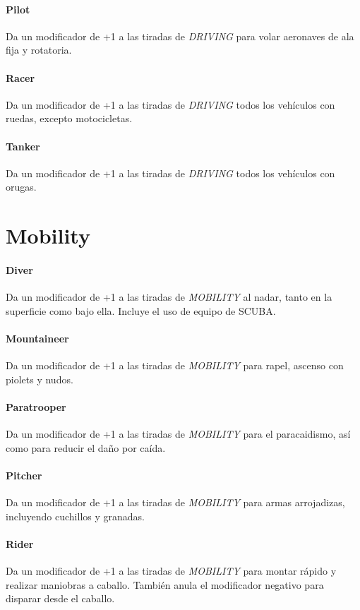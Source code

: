     \paragraph{Pilot}
    Da un modificador de +1 a las tiradas de \emph{DRIVING} para volar aeronaves de ala fija y rotatoria.

    \paragraph{Racer}
    Da un modificador de +1 a las tiradas de \emph{DRIVING} todos los vehículos con ruedas, excepto motocicletas.

    \paragraph{Tanker}
    Da un modificador de +1 a las tiradas de \emph{DRIVING} todos los vehículos con orugas.

\section{Mobility}

    \paragraph{Diver}
    Da un modificador de +1 a las tiradas de \emph{MOBILITY} al nadar, tanto en la superficie como bajo ella. Incluye el uso de equipo de SCUBA.

    \paragraph{Mountaineer}
    Da un modificador de +1 a las tiradas de \emph{MOBILITY} para rapel, ascenso con piolets y nudos.

    \paragraph{Paratrooper}
    Da un modificador de +1 a las tiradas de \emph{MOBILITY} para el paracaidismo, así como para reducir el daño por caída.

    \paragraph{Pitcher}
    Da un modificador de +1 a las tiradas de \emph{MOBILITY} para armas arrojadizas, incluyendo cuchillos y granadas.

    \paragraph{Rider}
    Da un modificador de +1 a las tiradas de \emph{MOBILITY} para montar rápido y realizar maniobras a caballo. También anula el modificador negativo para disparar desde el caballo.

